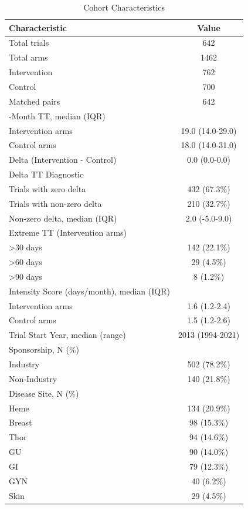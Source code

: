 \begin{table}[htbp]
\centering
\caption{Cohort Characteristics}
\begin{tabular}{lc}
\toprule
Characteristic & Value \\
\midrule
Total trials & 642 \\
Total arms & 1462 \\
  Intervention & 762 \\
  Control & 700 \\
Matched pairs & 642 \\
\addlinespace
12-Month TT, median (IQR) &  \\
  Intervention arms & 19.0 (14.0-29.0) \\
  Control arms & 18.0 (14.0-31.0) \\
  Delta (Intervention - Control) & 0.0 (0.0-0.0) \\
\addlinespace
Delta TT Diagnostic &  \\
  Trials with zero delta & 432 (67.3\%) \\
  Trials with non-zero delta & 210 (32.7\%) \\
  Non-zero delta, median (IQR) & 2.0 (-5.0-9.0) \\
\addlinespace
Extreme TT (Intervention arms) &  \\
  >30 days & 142 (22.1\%) \\
  >60 days & 29 (4.5\%) \\
  >90 days & 8 (1.2\%) \\
\addlinespace
Intensity Score (days/month), median (IQR) &  \\
  Intervention arms & 1.6 (1.2-2.4) \\
  Control arms & 1.5 (1.2-2.6) \\
\addlinespace
Trial Start Year, median (range) & 2013 (1994-2021) \\
\addlinespace
Sponsorship, N (\%) &  \\
  Industry & 502 (78.2\%) \\
  Non-Industry & 140 (21.8\%) \\
\addlinespace
Disease Site, N (\%) &  \\
  Heme & 134 (20.9\%) \\
  Breast & 98 (15.3\%) \\
  Thor & 94 (14.6\%) \\
  GU & 90 (14.0\%) \\
  GI & 79 (12.3\%) \\
  GYN & 40 (6.2\%) \\
  Skin & 29 (4.5\%) \\

\end{tabular}
\end{table}

